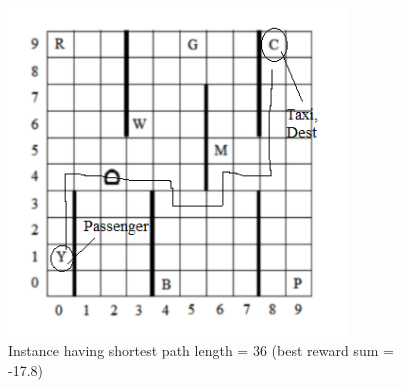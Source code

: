 \documentclass{article}
\begin{document}
\begin{enumerate}[a)]
\begin{center}
    \begin{figure}[H]
    \hfill\includegraphics[width=9cm]{instance.png}\hspace*{\fill}
    \caption{Instance having shortest path length = 36 (best reward sum = -17.8)}
    \label{fig: Instance having shortest path length = 36 }
\end{figure}
\end{center}


\end{enumerate}
\end{document}
